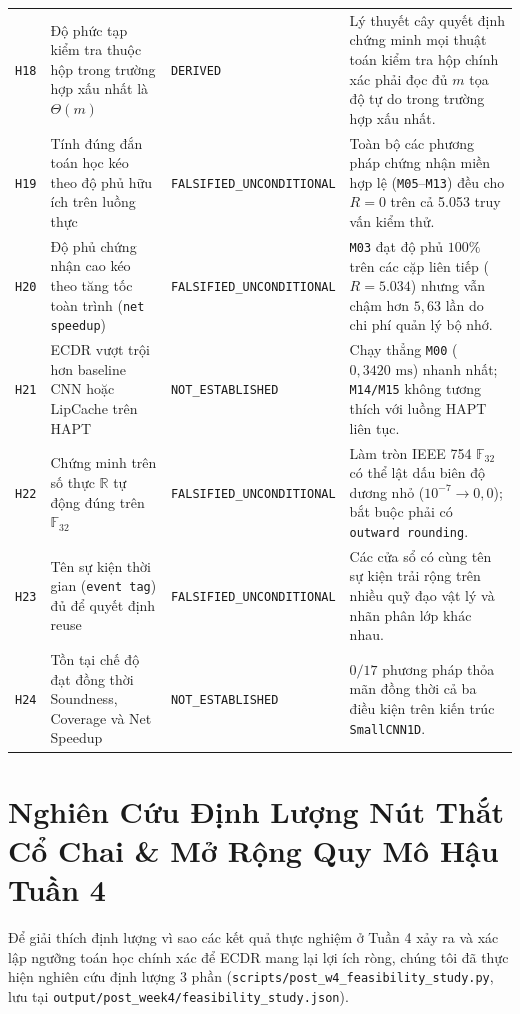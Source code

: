 \documentclass[11pt,a4paper]{article}
\newcommand{\R}{\mathbb{R}}
\newcommand{\F}{\mathbb{F}}
\newcommand{\code}[1]{{\small\ttfamily\nolinkurl{#1}}}
\theoremstyle{remark}
\begin{document}
{\begin{longtable}{@{}p{0.8cm}p{4.3cm}p{2.9cm}p{7.2cm}@{}}
\code{H18} & Độ phức tạp kiểm tra thuộc hộp trong trường hợp xấu nhất là $\Theta(m)$ & \code{DERIVED} & Lý thuyết cây quyết định chứng minh mọi thuật toán kiểm tra hộp chính xác phải đọc đủ $m$ tọa độ tự do trong trường hợp xấu nhất. \\
\code{H19} & Tính đúng đắn toán học kéo theo độ phủ hữu ích trên luồng thực & \code{FALSIFIED\_UNCONDITIONAL} & Toàn bộ các phương pháp chứng nhận miền hợp lệ (\code{M05}--\code{M13}) đều cho $R = 0$ trên cả 5.053 truy vấn kiểm thử. \\
\code{H20} & Độ phủ chứng nhận cao kéo theo tăng tốc toàn trình (\code{net speedup}) & \code{FALSIFIED\_UNCONDITIONAL} & \code{M03} đạt độ phủ $100\%$ trên các cặp liên tiếp ($R=5.034$) nhưng vẫn chậm hơn $5,63$ lần do chi phí quản lý bộ nhớ. \\
\code{H21} & ECDR vượt trội hơn baseline CNN hoặc LipCache trên HAPT & \code{NOT\_ESTABLISHED} & Chạy thẳng \code{M00} ($0,3420\text{ ms}$) nhanh nhất; \code{M14/M15} không tương thích với luồng HAPT liên tục. \\
\code{H22} & Chứng minh trên số thực $\R$ tự động đúng trên $\F_{32}$ & \code{FALSIFIED\_UNCONDITIONAL} & Làm tròn IEEE 754 $\F_{32}$ có thể lật dấu biên độ dương nhỏ ($10^{-7} \to 0,0$); bắt buộc phải có \code{outward rounding}. \\
\code{H23} & Tên sự kiện thời gian (\code{event tag}) đủ để quyết định reuse & \code{FALSIFIED\_UNCONDITIONAL} & Các cửa sổ có cùng tên sự kiện trải rộng trên nhiều quỹ đạo vật lý và nhãn phân lớp khác nhau. \\
\code{H24} & Tồn tại chế độ đạt đồng thời Soundness, Coverage và Net Speedup & \code{NOT\_ESTABLISHED} & $0/17$ phương pháp thỏa mãn đồng thời cả ba điều kiện trên kiến trúc \code{SmallCNN1D}. \\
\end{longtable}
}

\section{Nghiên Cứu Định Lượng Nút Thắt Cổ Chai \& Mở Rộng Quy Mô Hậu Tuần 4}

Để giải thích định lượng vì sao các kết quả thực nghiệm ở Tuần 4 xảy ra và xác lập ngưỡng toán học chính xác để ECDR mang lại lợi ích ròng, chúng tôi đã thực hiện nghiên cứu định lượng 3 phần (\code{scripts/post\_w4\_feasibility\_study.py}, lưu tại \code{output/post\_week4/feasibility\_study.json}).
\end{document}
